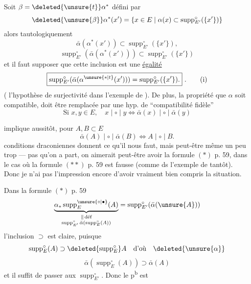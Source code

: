 Soit $\beta=\deleted{\unsure{t}}\alpha^*$ défini par
\[
\deleted{\unsure{\beta}}\alpha^*(x')=\{x\in E\mid\alpha(x)\subset\operatorname{supp}^{\circ}_{E'}(\{x'\})\}
\]
 alors tautologiquement
\[
\bar\alpha(\alpha^*(x'))\subset\operatorname{supp}^{\circ}_{E'}(\{x'\}),
\]
\[
\operatorname{supp}^{\circ}_{E'}(\bar\alpha(\alpha^*(x')))\subset\operatorname{supp}^{\circ}_{E'}(\{x'\})
\]
et il faut supposer que cette inclusion est une \uline{égalité}
\[
\boxed{\operatorname{supp}^{\circ}_{E'}(\bar\alpha(\alpha^{\unsure{*|t}}(x')))=\operatorname{supp}^{\circ}_{E'}(\{x'\}).}\ .\tag*{(i)}
\]
( l'hypothèse de surjectivité dans l'exemple de ). De plus, la propriété que $\alpha$ soit compatible, doit être remplacée par une hyp. de ``compatibilité fidèle''
\[
\boxed{\text{Si }x,y\in E,\quad x\mid\circ\mid y\Longleftrightarrow\bar\alpha(x)\mid\circ\mid\bar\alpha(y)}\tag*{(ii)}
\]

 implique aussitôt, pour $A,B\subset E$
\[
\bar\alpha(A)\mid\circ\mid\bar\alpha(B)\Longleftrightarrow A\mid\circ\mid B.
\]
 conditions draconiennes donnent ce qu'il nous faut, mais peut-être même un peu  trop ---  pas qu'on a
 part, on aimerait peut-être  avoir la formule $(*)$ p. 59, dans le cas où la formule $(**)$ p. 59 est fausse (comme ds l'exemple de tantôt). Donc je n'ai pas l'impression encore d'avoir vraiment bien compris la situation.

Dans la formule $(*)$ p. 59
\[
\underbrace{\alpha_*\operatorname{supp}^{\unsure{\circ|\bullet}}_E(A)}_{\substack{\Vert\,\text{déf}\\\operatorname{supp}^{\circ}_{E'}\bar\alpha(\operatorname{supp}^{\circ}_E(A))}}
=\operatorname{supp}^{\circ}_{E'}(\bar\alpha(\unsure{A}))
\]
l'inclusion $\supset$ est claire, puisque
\[
\operatorname{supp}^{\circ}_E(A)\supset\deleted{\operatorname{supp}^{\circ}_E}A\quad\text{d'où}\quad\deleted{\unsure{\alpha}}
\]
\[
\bar\alpha(\operatorname{supp}^{\circ}_E(A))\supset\bar\alpha(A)
\]
et il suffit de passer aux $\operatorname{supp}^{\circ}_{E'}$. Donc le p\textsuperscript{b} est

